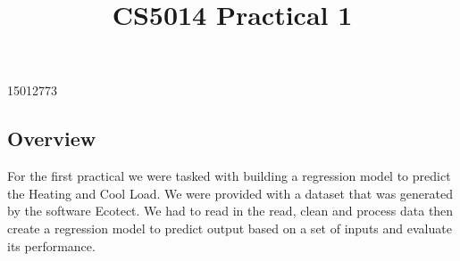 \documentclass[11pt]{article}
\title{CS5014 Practical 1}
\begin{document}
    
    
    \maketitle
    
    

    
    15012773

    \hypertarget{overview}{%
\subsection{Overview}\label{overview}}

For the first practical we were tasked with building a regression model
to predict the Heating and Cool Load. We were provided with a dataset
that was generated by the software Ecotect. We had to read in the read,
clean and process data then create a regression model to predict output
based on a set of inputs and evaluate its performance.
\end{document}
